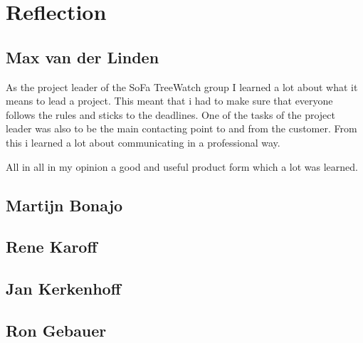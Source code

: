 \section{Reflection}
\subsection{Max van der Linden}
As the project leader of the SoFa TreeWatch group I learned a lot about what it means to lead a project. This meant that i had to make sure that everyone follows the rules and sticks to the deadlines. One of the tasks of the project leader was also to be the main contacting point to and from the customer. From this i learned a lot about communicating in a professional way.

All in all in my opinion a good and useful product form which a lot was learned.

\subsection{Martijn Bonajo}


\subsection{Rene Karoff}


\subsection{Jan Kerkenhoff}


\subsection{Ron Gebauer}
